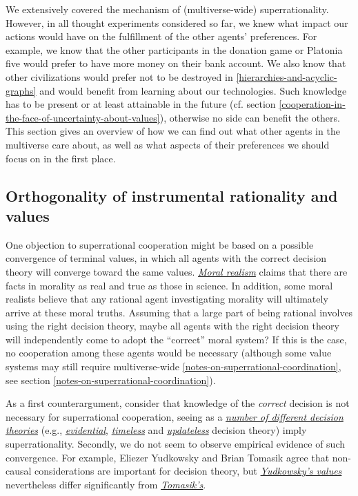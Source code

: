 We extensively covered the mechanism of (multiverse-wide)
superrationality. However, in all thought experiments considered so far,
we knew what impact our actions would have on the fulfillment of the
other agents' preferences. For example, we know that the other
participants in the donation game or Platonia five would prefer to have
more money on their bank account. We also know that other civilizations
would prefer not to be destroyed in
\ref{hierarchies-and-acyclic-graphs} and would benefit from learning about our technologies. Such
knowledge has to be present or at least attainable in the future (cf.
section
\ref{cooperation-in-the-face-of-uncertainty-about-values}),
otherwise no side can benefit the others. This section gives an overview
of how we can find out what other agents in the multiverse care about,
as well as what aspects of their preferences we should focus on in the
first place.

\hypertarget{orthogonality-of-instrumental-rationality-and-values}{\subsection{Orthogonality
of instrumental rationality and
values}\label{orthogonality-of-instrumental-rationality-and-values}}

One objection to superrational cooperation might be based on a possible
convergence of terminal values, in which all agents with the correct
decision theory will converge toward the same values.
\href{https://en.wikipedia.org/wiki/Moral_realism}{\emph{Moral realism}}
claims that there are facts in morality as real and true as those in
science. In addition, some moral realists believe that any rational
agent investigating morality will ultimately arrive at these moral
truths. Assuming that a large part of being rational involves using the
right decision theory, maybe all agents with the right decision theory
will independently come to adopt the ``correct'' moral system? If this
is the case, no cooperation among these agents would be necessary
(although some value systems may still require multiverse-wide
\ref{notes-on-superrational-coordination},
see section
\ref{notes-on-superrational-coordination}).

As a first counterargument, consider that knowledge of the
\emph{correct} decision is not necessary for superrational cooperation,
seeing as a
\href{https://casparoesterheld.com/a-comprehensive-list-of-decision-theories/}{\emph{number
of different decision theories}} (e.g.,
\href{https://en.wikipedia.org/wiki/Evidential_decision_theory}{\emph{evidential}},
\href{https://intelligence.org/files/TDT.pdf}{\emph{timeless}} and
\href{https://wiki.lesswrong.com/wiki/Updateless_decision_theory}{\emph{updateless}}
decision theory) imply superrationality. Secondly, we do not seem to
observe empirical evidence of such convergence. For example, Eliezer
Yudkowsky and Brian Tomasik agree that non-causal considerations are
important for decision theory, but
\href{https://wiki.lesswrong.com/wiki/Fun_theory}{\emph{Yudkowsky's
values}} nevertheless differ significantly from
\href{http://reducing-suffering.org/\#Ethics}{\emph{Tomasik's}}.

